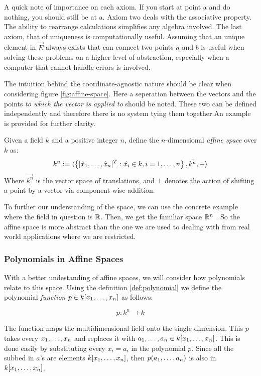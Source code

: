 A quick note of importance on each axiom. If you start at point a and do nothing, you should still be at a.  Axiom two deals with the associative property. The ability to rearrange calculations simplifies any algebra involved. The last axiom, that of uniqueness is computationally useful. Assuming that an unique element in $\vec{E}$ always exists that can connect two points $a$ and $b$ is useful when solving these problems on a higher level of abstraction, especially when a computer that cannot handle errors is involved. 

The intuition behind the coordinate-agnostic nature should be clear when considering figure \ref{fig:affine-space}. Here a seperation between the vectors and the points \textit{to which the vector is applied to} should be noted. These two can be defined independently and therefore there is no system tying them together.An example is provided for further clarity.

\begin{example}\label{def:affine-space}
    Given a field $k$ and a positive integer $n$, define the $n$-dimensional \textit{affine space} over $k$ as:
    \[
         k^n := \langle \left\{[\hat{x}_1, \dots, \hat{x}_n]^T : \hat{x_i} \in k, i=1,\dots, n\right\}, \vec{k^n}, + \rangle
    \]
    Where $\vec{k^n}$ is the vector space of translations, and $+$ denotes the action of shifting a point by a vector via component-wise addition.
\end{example}

To further our understanding of the space, we can use the concrete example where the field in question is $\mathbb{R}$. Then, we get the familiar space $\mathbb{R}^n$ . So the affine space is more abstract than the one we are used to dealing with from real world applications where we are restricted. 

\subsubsection{Polynomials in Affine Spaces}    
\label{sssec:polynomials-in-affine-spaces}

With a better undestanding of affine spaces, we will consider how polynomials relate to this space. Using the definition \ref{def:polynomial} we define the polynomial \textit{function} $p \in k\lbrack x_1, \dots, x_n \rbrack$ as follows: 

\[
    p : k^n  \rightarrow k
\]

The function maps the multidimensional field onto the single dimension. This $p$ takes every $x_1, \dots, x_n$ and replaces it with $a_1, \dots, a_n \in k\lbrack x_1, \dots, x_n \rbrack$. This is done easily by substituting every $x_i = a_i$ in the polynomial $p$. Since all the subbed in $a$'s are elements $k\lbrack x_1, \dots, x_n \rbrack$, then $p(a_1, \dots, a_n)$ is also in $k\lbrack x_1, \dots, x_n \rbrack$.


